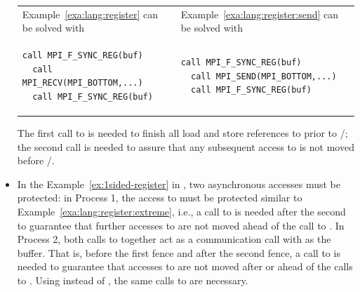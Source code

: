 \begin{itemize}
\begin{center}
\vspace*{2pt}%
\begin{tabular}{p{67mm}p{67mm}}
Example~\ref{exa:lang:register} can be solved with
&
Example~\ref{exa:lang:register:send} can be solved with
\\[-6pt]%
\begin{lstlisting}[language={[MPI]Fortran}]
  call MPI_F_SYNC_REG(buf)
  call MPI_RECV(MPI_BOTTOM,...)
  call MPI_F_SYNC_REG(buf)
\end{lstlisting}
&
\begin{lstlisting}[language={[MPI]Fortran}]
  call MPI_F_SYNC_REG(buf)
  call MPI_SEND(MPI_BOTTOM,...)
  call MPI_F_SYNC_REG(buf)
\end{lstlisting}
\\[-9pt]%
\end{tabular}
\end{center}
  The first call to 
  is needed to finish all load and store
  references to  prior to  /;
  the second call is needed to assure that any subsequent
  access to  is not moved before
  /.

\item In the Example~\ref{ex:1sided-register} in ,
   two asynchronous accesses must be protected:
   in Process 1, the access to  must be protected
   similar to Example~\ref{exa:lang:register:extreme}, i.e.,
   a call to  is needed
   after the second  to guarantee that
   further accesses to  are not moved
   ahead of the call to .
   In Process 2, both calls to  together
   act as a communication call with  as the buffer.
   That is, before the first fence and after the second fence,
   a call to  is needed
   to guarantee that accesses to  are not moved
   after or ahead of the calls to .
   Using  instead of ,
   the same calls to  are necessary.


\end{itemize}
